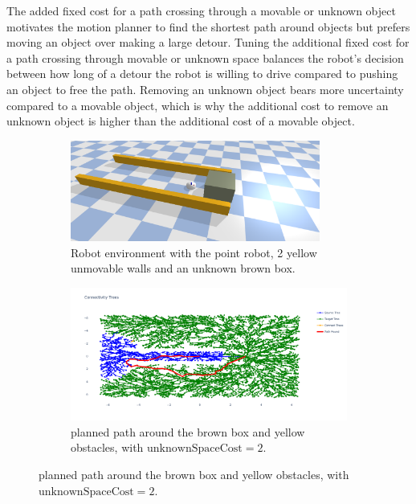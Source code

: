 The added fixed cost for a path crossing through a movable or unknown object motivates the motion planner to find the shortest path around objects but prefers moving an object over making a large detour. Tuning the additional fixed cost for a path crossing through movable or unknown space balances the robot's decision between how long of a detour the robot is willing to drive compared to pushing an object to free the path. Removing an unknown object bears more uncertainty compared to a movable object, which is why the additional cost to remove an unknown object is higher than the additional cost of a movable object. 

\begin{figure}[H]

    \centering
    \begin{subfigure}{\textwidth}
    \centering
    \includegraphics[width=0.9\textwidth]{figures/push_or_drive} \caption{Robot environment with the point robot, 2 yellow unmovable walls and an unknown brown box.}
    \end{subfigure}

    \begin{subfigure}{1.11\textwidth}
    \centering
    \includegraphics[width=\textwidth]{figures/mp_high_fixed_cost}
    \caption{planned path around the brown box and yellow obstacles, with $\textrm{unknownSpaceCost} = 2$.}
    \end{subfigure}


\end{figure}
